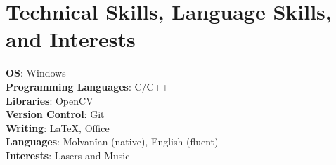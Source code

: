 
\section{Technical Skills, Language Skills, and Interests}

\begin{itemize}[leftmargin=0.15in, label={}]
  \small{
    \item{
      \textbf{OS}{: Windows} \\
      \textbf{Programming Languages}{: C/C++} \\
      \textbf{Libraries}{: OpenCV}\\
      \textbf{Version Control}{: Git} \\
      \textbf{Writing}{: \LaTeX, Office} \\
      \textbf{Languages}{: Molvanîan (native), English (fluent)} \\
      \textbf{Interests}{: Lasers and Music}
    }
  }
\end{itemize}